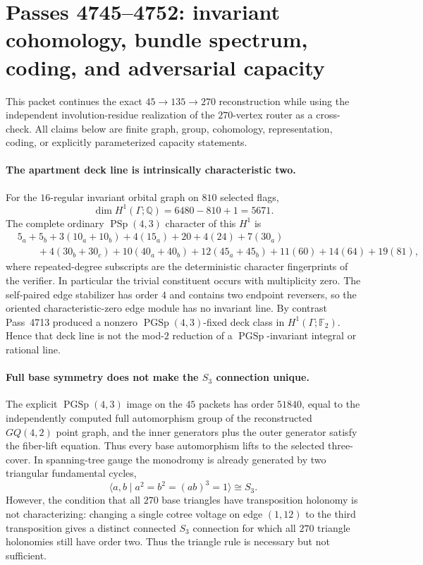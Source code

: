 \section*{Passes 4745--4752: invariant cohomology, bundle spectrum, coding, and adversarial capacity}

This packet continues the exact $45\to135\to270$ reconstruction while using the independent involution-residue realization of the $270$-vertex router as a cross-check.  All claims below are finite graph, group, cohomology, representation, coding, or explicitly parameterized capacity statements.

\paragraph{The apartment deck line is intrinsically characteristic two.}
For the $16$-regular invariant orbital graph on $810$ selected flags,
\[
  \dim H^1(\Gamma;\mathbb Q)=6480-810+1=5671.
\]
The complete ordinary $\operatorname{PSp}(4,3)$ character of this $H^1$ is
\[
\begin{aligned}
 &5_a+5_b+3(10_a+10_b)+4(15_a)+20+4(24)+7(30_a)\\
 &\qquad +4(30_b+30_c)+10(40_a+40_b)+12(45_a+45_b)
 +11(60)+14(64)+19(81),
\end{aligned}
\]
where repeated-degree subscripts are the deterministic character fingerprints of the verifier.  In particular the trivial constituent occurs with multiplicity zero.  The self-paired edge stabilizer has order $4$ and contains two endpoint reversers, so the oriented characteristic-zero edge module has no invariant line.  By contrast Pass~4713 produced a nonzero $\operatorname{PGSp}(4,3)$-fixed deck class in $H^1(\Gamma;\mathbb F_2)$.  Hence that deck line is not the mod-$2$ reduction of a $\operatorname{PGSp}$-invariant integral or rational line.

\paragraph{Full base symmetry does not make the $S_3$ connection unique.}
The explicit $\operatorname{PGSp}(4,3)$ image on the $45$ packets has order $51840$, equal to the independently computed full automorphism group of the reconstructed $GQ(4,2)$ point graph, and the inner generators plus the outer generator satisfy the fiber-lift equation.  Thus every base automorphism lifts to the selected three-cover.  In spanning-tree gauge the monodromy is already generated by two triangular fundamental cycles,
\[
  \langle a,b\mid a^2=b^2=(ab)^3=1\rangle\cong S_3.
\]
However, the condition that all $270$ base triangles have transposition holonomy is not characterizing: changing a single cotree voltage on edge $(1,12)$ to the third transposition gives a distinct connected $S_3$ connection for which all $270$ triangle holonomies still have order two.  Thus the triangle rule is necessary but not sufficient.

